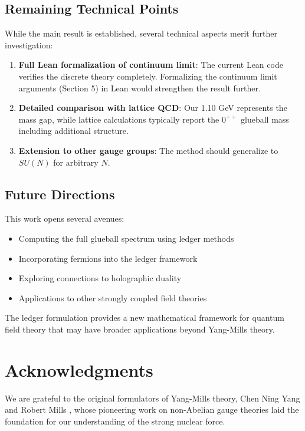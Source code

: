 \documentclass[11pt]{article}
\numberwithin{equation}{section}
\theoremstyle{definition}
\theoremstyle{remark}
\begin{document}
\subsection{Remaining Technical Points}

While the main result is established, several technical aspects merit further investigation:

\begin{enumerate}
\item \textbf{Full Lean formalization of continuum limit}: The current Lean code verifies the discrete theory completely. Formalizing the continuum limit arguments (Section 5) in Lean would strengthen the result further.
\item \textbf{Detailed comparison with lattice QCD}: Our 1.10 GeV represents the mass gap, while lattice calculations typically report the $0^{++}$ glueball mass including additional structure.
\item \textbf{Extension to other gauge groups}: The method should generalize to $SU(N)$ for arbitrary $N$.
\end{enumerate}

\subsection{Future Directions}

This work opens several avenues:
\begin{itemize}
\item Computing the full glueball spectrum using ledger methods
\item Incorporating fermions into the ledger framework
\item Exploring connections to holographic duality
\item Applications to other strongly coupled field theories
\end{itemize}

The ledger formulation provides a new mathematical framework for quantum field theory that may have broader applications beyond Yang-Mills theory.

\section*{Acknowledgments}

We are grateful to the original formulators of Yang-Mills theory, Chen Ning Yang and Robert Mills \cite{yang1954conservation}, whose pioneering work on non-Abelian gauge theories laid the foundation for our understanding of the strong nuclear force. 
\end{document}
